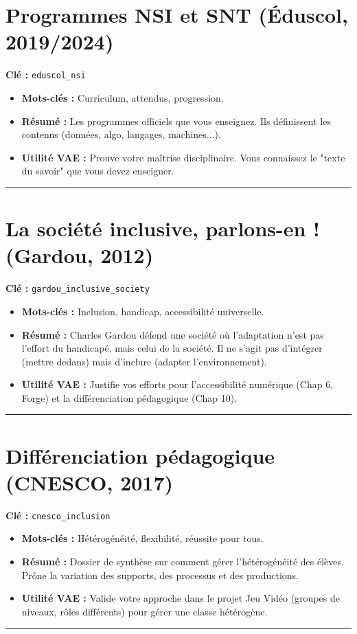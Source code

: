 \section{Programmes NSI et SNT (Éduscol, 2019/2024)}
\textbf{Clé :} \texttt{eduscol\_nsi}
\begin{itemize}
    \item \textbf{Mots-clés :} Curriculum, attendus, progression.
    \item \textbf{Résumé :} Les programmes officiels que vous enseignez. Ils définissent les contenus (données, algo, langages, machines...).
    \item \textbf{Utilité VAE :} Prouve votre maîtrise disciplinaire. Vous connaissez le "texte du savoir" que vous devez enseigner.
\end{itemize}
\hrule

\section{La société inclusive, parlons-en ! (Gardou, 2012)}
\textbf{Clé :} \texttt{gardou\_inclusive\_society}
\begin{itemize}
    \item \textbf{Mots-clés :} Inclusion, handicap, accessibilité universelle.
    \item \textbf{Résumé :} Charles Gardou défend une société où l'adaptation n'est pas l'effort du handicapé, mais celui de la société. Il ne s'agit pas d'intégrer (mettre dedans) mais d'inclure (adapter l'environnement).
    \item \textbf{Utilité VAE :} Justifie vos efforts pour l'accessibilité numérique (Chap 6, Forge) et la différenciation pédagogique (Chap 10).
\end{itemize}
\hrule

\section{Différenciation pédagogique (CNESCO, 2017)}
\textbf{Clé :} \texttt{cnesco\_inclusion}
\begin{itemize}
    \item \textbf{Mots-clés :} Hétérogénéité, flexibilité, réussite pour tous.
    \item \textbf{Résumé :} Dossier de synthèse sur comment gérer l'hétérogénéité des élèves. Prône la variation des supports, des processus et des productions.
    \item \textbf{Utilité VAE :} Valide votre approche dans le projet Jeu Vidéo (groupes de niveaux, rôles différents) pour gérer une classe hétérogène.
\end{itemize}
\hrule

